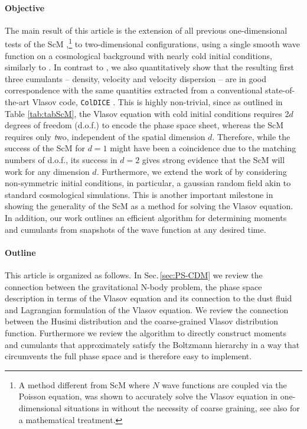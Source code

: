 \documentclass[twocolumn, nofootinbib, showpacs, superscriptaddress]{revtex4-1}
\begin{document}
\paragraph*{Objective}
The main result of this article is the extension of all previous one-dimensional tests of the 
 ScM \cite{T89,SRvB89,WK93,DW96,UhlemannKoppHaugg2014,GarnyKonstandin2017},\footnote{A method  different from ScM  where $N$ wave functions are coupled via the Poisson equation, was shown to accurately solve the Vlasov equation in one-dimensional situations in \cite{SBRB13} 
without the necessity of coarse graining, see also \cite{MarkowichMauser1993,ZhangZhengMauser2002} for a mathematical treatment.} to two-dimensional configurations, 
using  a  single smooth wave function on a cosmological background with nearly cold initial conditions, 
similarly to \cite{UhlemannKoppHaugg2014}. 
In contrast to \cite{UhlemannKoppHaugg2014}, we also quantitatively show that the resulting first three 
cumulants -- density, velocity and velocity dispersion -- are in good correspondence 
with the same quantities extracted from a conventional state-of-the-art Vlasov code, \texttt{ColDICE} \cite{SousbieColombi2016}.
This is highly non-trivial, since as outlined in Table \ref{tab:tabScM}, the Vlasov equation with cold initial 
conditions requires 2$d$ degrees of freedom (d.o.f.) to encode the phase space sheet, whereas the ScM requires only {\emph two}, 
independent of the spatial dimension $d$. Therefore, while the success of the ScM for $d=1$ might have been a coincidence 
due to the matching numbers of d.o.f., its success in $d=2$ gives strong evidence that the ScM will work for any dimension $d$.
Furthermore, we extend the work of \cite{UhlemannKoppHaugg2014} by considering non-symmetric initial conditions, 
in particular, a gaussian random field akin to standard cosmological simulations.
This is another important milestone in showing the generality of the ScM as a method for solving the Vlasov equation.
In addition, our work outlines an efficient algorithm for determining moments and cumulants from snapshots of the wave function at 
any desired time. 



\paragraph*{Outline}
This article is organized as follows. In Sec.\,\ref{sec:PS-CDM} we review the connection
 between the gravitational N-body problem, the phase space description in terms of the Vlasov equation and its connection to the dust fluid and Lagrangian formulation of the Vlasov equation.
 We review the connection between the Husimi distribution and the coarse-grained Vlasov distribution function. 
Furthermore we review the algorithm to directly construct moments and cumulants that approximately satisfy the Boltzmann hierarchy 
in a way that circumvents the full phase space and is therefore easy to implement. 
\end{document}
